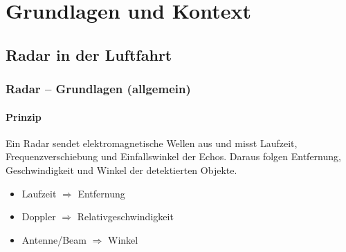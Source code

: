 \part{Grundlagen und Kontext}
\chapter{Radar in der Luftfahrt}

\usetikzlibrary{arrows.meta, positioning}

\section{Radar – Grundlagen (allgemein)}

\subsection{Prinzip}
Ein Radar sendet elektromagnetische Wellen aus und misst Laufzeit,
Frequenzverschiebung und Einfallswinkel der Echos.
Daraus folgen Entfernung, Geschwindigkeit und Winkel der detektierten Objekte.
\begin{itemize}
  \item Laufzeit $\Rightarrow$ Entfernung
  \item Doppler $\Rightarrow$ Relativgeschwindigkeit
  \item Antenne/Beam $\Rightarrow$ Winkel
\end{itemize}

